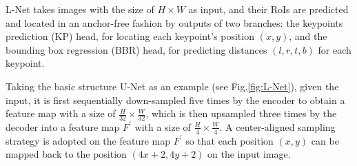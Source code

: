 \documentclass{article}
\begin{document}
L-Net takes images with the size of $H \times W$ as input, and their RoIs are predicted and located in an anchor-free fashion by outputs of two branches: the keypoints prediction (KP) head, for locating each keypoint's position $(x,y)$, and the bounding box regression (BBR) head, for predicting distances $(l,r,t,b)$ for each keypoint. \par 

Taking the basic structure U-Net as an example (see Fig.\ref{fig:L-Net}), given the input, it is first sequentially down-sampled five times by the encoder to obtain a feature map with a size of $\frac{H}{32} \times \frac{W}{32}$, which is then upsampled three times by the decoder into a feature map $F^{\prime}$ with a size of $\frac{H}{4} \times \frac{W}{4}$. A center-aligned sampling strategy is adopted on the feature map $F^{\prime}$ so that each position $(x,y)$ can be mapped back to the position $(4x+2, 4y+2)$ on the input image.
\par


\end{document}
